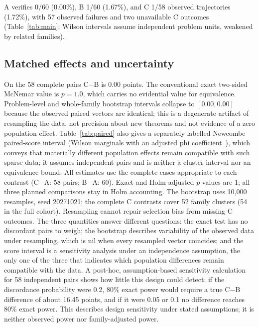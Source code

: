 \documentclass[runningheads,a4paper]{llncs}
\begin{document}
A verifies 0/60 (0.00\%), B 1/60 (1.67\%), and C 1/58 observed trajectories
(1.72\%), with 57 observed failures and two unavailable C outcomes
(Table~\ref{tab:main}; Wilson intervals assume independent problem units, weakened
by related families). 

\subsection{Matched effects and uncertainty}
On the 58 complete pairs C$-$B is 0.00 points. The conventional exact two-sided
McNemar value is $p=1.0$, which carries no evidential value for equivalence.
Problem-level and whole-family bootstrap intervals collapse to $[0.00,0.00]$
because the observed paired vectors are identical; this is a degenerate artifact of
resampling the data, not precision about new theorems and not evidence of a zero
population effect. Table~\ref{tab:paired} also gives a separately labelled
Newcombe paired-score interval (Wilson marginals with an adjusted phi
coefficient~\cite{newcombe1998paired}), which conveys that materially different
population effects remain compatible with such sparse data; it assumes independent
pairs and is neither a cluster interval nor an equivalence bound. All estimates use
the complete cases appropriate to each contrast (C$-$A: 58 pairs; B$-$A: 60). Exact
and Holm-adjusted $p$ values are 1; all three planned comparisons stay in Holm
accounting. The bootstrap uses 10{,}000 resamples, seed 20271021; the complete C
contrasts cover 52 family clusters (54 in the full cohort). Resampling cannot repair selection bias from missing C outcomes. The three quantities answer different questions: the exact test has no discordant pairs to weigh; the bootstrap describes variability of the observed data under resampling, which is nil when every resampled vector coincides; and the score interval is a sensitivity analysis under an independence assumption, the only one of the three that indicates which population differences remain compatible with the data. A post-hoc, assumption-based sensitivity calculation for 58 independent pairs shows how little this design could detect: if the discordance probability were 0.2, 80\% exact power would require a true C$-$B difference of about 16.45 points, and if it were 0.05 or 0.1 no difference reaches 80\% exact power. This describes design sensitivity under stated assumptions; it is neither observed power nor family-adjusted power.
\end{document}
